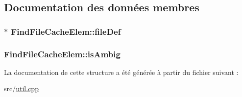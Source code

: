 \subsection{Documentation des données membres}
\hypertarget{struct_find_file_cache_elem_a39ee6985f0ee3593ee2d8d0b9e0f5006}{}
\subsubsection[{file\+Def}]{$\ast$ Find\+File\+Cache\+Elem\+::file\+Def}\label{struct_find_file_cache_elem_a39ee6985f0ee3593ee2d8d0b9e0f5006}
\hypertarget{struct_find_file_cache_elem_a380e1879b7462592ef5eb5c7289f5714}{}
\subsubsection[{is\+Ambig}]{ Find\+File\+Cache\+Elem\+::is\+Ambig}\label{struct_find_file_cache_elem_a380e1879b7462592ef5eb5c7289f5714}


La documentation de cette structure a été générée à partir du fichier suivant \+:\begin{DoxyCompactItemize}
\item 
src/\hyperlink{util_8cpp}{util.\+cpp}\end{DoxyCompactItemize}

